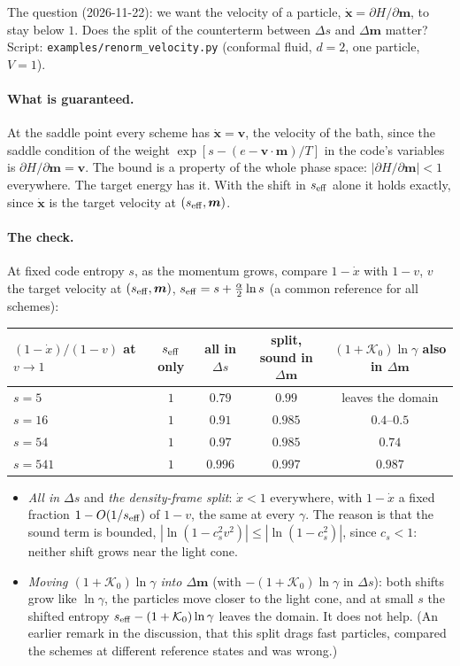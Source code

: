 \documentclass[11pt,aps,preprint,nofootinbib,superscriptaddress,tightenlines]{revtex4-2}
\let\oldparagraph\paragraph
\renewcommand{\paragraph}{\par\bigskip\oldparagraph}
\begin{document}
The question (2026-11-22): we want the velocity of a particle, $\dot{\bm x}=\partial H/\partial\bm m$, to stay below $1$.  Does the split of the counterterm between $\Delta s$
and $\Delta\bm m$ matter?  Script: \nolinkurl{examples/renorm_velocity.py} (conformal fluid, $d=2$, one particle, $V=1$).

\paragraph{What is guaranteed.}  At the saddle point every scheme has $\dot{\bm x}=\bm v$, the velocity of the bath, since the saddle condition of the weight
$\exp[s-(e-\bm v\cdot\bm m)/T]$ in the code's variables is $\partial H/\partial\bm m=\bm v$.  The bound is a property of the whole phase space: $|\partial H/\partial\bm m|<1$
everywhere.  The target energy has it.  With the shift in $s_{\rm eff}$ alone it holds exactly, since $\dot{\bm x}$ is the target velocity at $(s_{\rm eff},\bm m)$.

\paragraph{The check.}  At fixed code entropy $s$, as the momentum grows, compare $1-\dot x$ with $1-v$, $v$ the target velocity at $(s_{\rm eff},\bm m)$, $s_{\rm eff}=s+\tfrac\alpha2\ln s$
(a common reference for all schemes):
\begin{center}
\small
\begin{tabular}{lcccc}
\toprule
$(1-\dot x)/(1-v)$ at $v\to1$ & $s_{\rm eff}$ only & all in $\Delta s$ & split, sound in $\Delta\bm m$ & $(1+\mathcal K_0)\ln\gamma$ also in $\Delta\bm m$ \\
\midrule
$s=5$ & $1$ & $0.79$ & $0.99$ & leaves the domain \\
$s=16$ & $1$ & $0.91$ & $0.985$ & $0.4$--$0.5$ \\
$s=54$ & $1$ & $0.97$ & $0.985$ & $0.74$ \\
$s=541$ & $1$ & $0.996$ & $0.997$ & $0.987$ \\
\bottomrule
\end{tabular}
\end{center}
\begin{itemize}
\item \emph{All in $\Delta s$} and \emph{the density-frame split}: $\dot x<1$ everywhere, with $1-\dot x$ a fixed fraction $1-O(1/s_{\rm eff})$ of $1-v$, the same at every $\gamma$.  The
  reason is that the sound term is bounded, $|\ln(1-c_s^2v^2)|\le|\ln(1-c_s^2)|$, since $c_s<1$: neither shift grows near the light cone.
\item \emph{Moving $(1+\mathcal K_0)\ln\gamma$ into $\Delta\bm m$} (with $-(1+\mathcal K_0)\ln\gamma$ in $\Delta s$): both shifts grow like $\ln\gamma$, the particles move closer to the light
  cone, and at small $s$ the shifted entropy $s_{\rm eff}-(1+\mathcal K_0)\ln\gamma$ leaves the domain.  It does not help.  (An earlier remark in the discussion, that this split drags fast
  particles, compared the schemes at different reference states and was wrong.)
\end{itemize}
\end{document}
